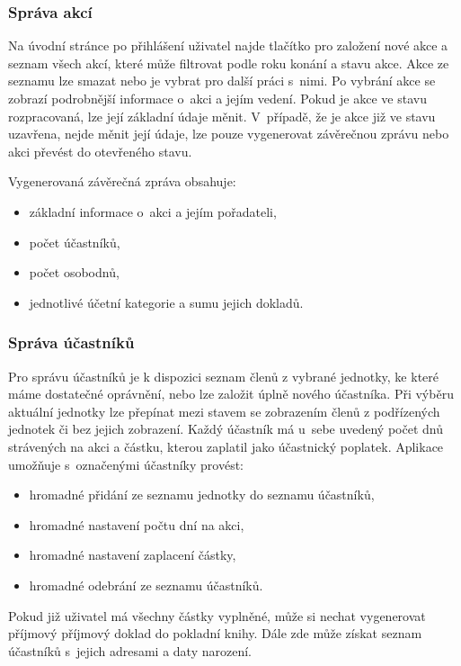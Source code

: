 \documentclass[thesis=B,czech]{FITthesis}[2012/04/27]
\begin{document}
\subsubsection{Správa akcí}
Na úvodní stránce po přihlášení uživatel najde tlačítko pro založení nové akce a seznam všech akcí, které může filtrovat podle roku konání a stavu akce. Akce ze seznamu lze smazat nebo je vybrat pro další práci s~nimi. Po vybrání akce se zobrazí podrobnější informace o~akci a jejím vedení. Pokud je akce ve stavu rozpracovaná, lze její základní údaje měnit. V~případě, že je akce již ve stavu uzavřena, nejde měnit její údaje, lze pouze vygenerovat závěrečnou zprávu nebo akci převést do otevřeného stavu.

Vygenerovaná závěrečná zpráva obsahuje:
\begin{itemize}
	\item základní informace o~akci a jejím pořadateli,
	\item počet účastníků,
	\item počet osobodnů,
	\item jednotlivé účetní kategorie a sumu jejich dokladů.
\end{itemize}

\subsubsection{Správa účastníků}
Pro správu účastníků je k dispozici seznam členů z vybrané jednotky, ke které máme dostatečné oprávnění, nebo lze založit úplně nového účastníka. Při výběru aktuální jednotky lze přepínat mezi stavem se zobrazením členů z podřízených jednotek či bez jejich zobrazení. Každý účastník má u~sebe uvedený počet dnů strávených na akci a částku, kterou zaplatil jako účastnický poplatek.
Aplikace umožňuje s~označenými účastníky provést:
\begin{itemize}
	\item hromadné přidání ze seznamu jednotky do seznamu účastníků,
	\item hromadné nastavení počtu dní na akci,
	\item hromadné nastavení zaplacení částky, 
	\item hromadné odebrání ze seznamu účastníků.
\end{itemize}
  
Pokud již uživatel má všechny částky vyplněné, může si nechat vygenerovat příjmový příjmový doklad do pokladní knihy. Dále zde může získat seznam účastníků s~jejich adresami a daty narození.
\end{document}
